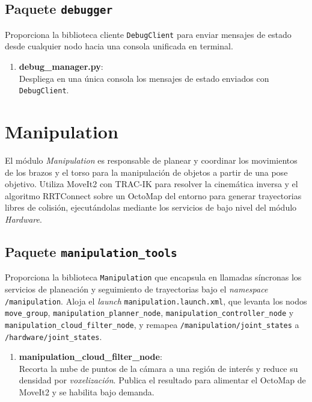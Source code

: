 \subsection{Paquete \texttt{debugger}}
Proporciona la biblioteca cliente \texttt{DebugClient} para enviar mensajes de estado desde cualquier nodo hacia una consola unificada en terminal.

\begin{enumerate}
    \item \textbf{debug\_manager.py}: \\
    Despliega en una única consola los mensajes de estado enviados con \texttt{DebugClient}.
\end{enumerate}


\section[Manipulation]{Manipulation}
\label{app:justina_manipulation}

El módulo \textit{Manipulation} es responsable de planear y coordinar los movimientos de los brazos y el torso para la manipulación de objetos a partir de una pose objetivo. Utiliza MoveIt2 con TRAC-IK para resolver la cinemática inversa y el algoritmo RRTConnect sobre un OctoMap del entorno para generar trayectorias libres de colisión, ejecutándolas mediante los servicios de bajo nivel del módulo \textit{Hardware}.

\subsection{Paquete \texttt{manipulation\_tools}}

Proporciona la biblioteca \texttt{Manipulation} que encapsula en llamadas síncronas los servicios de planeación y seguimiento de trayectorias bajo el \textit{namespace} \texttt{/manipulation}. Aloja el \textit{launch} \texttt{manipulation.launch.xml}, que levanta los nodos \texttt{move\_group}, \texttt{manipulation\_planner\_node}, \texttt{manipulation\_controller\_node} y \texttt{manipulation\_cloud\_filter\_node}, y remapea \texttt{/manipulation/joint\_states} a \texttt{/hardware/joint\_states}.

\begin{enumerate}
    \item \textbf{manipulation\_cloud\_filter\_node}: \\
    Recorta la nube de puntos de la cámara a una región de interés y reduce su densidad por \textit{voxelización}. Publica el resultado para alimentar el OctoMap de MoveIt2 y se habilita bajo demanda.
\end{enumerate}

